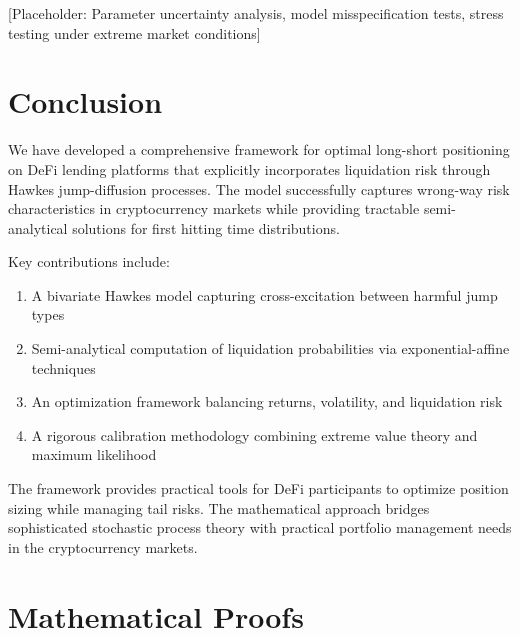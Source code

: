 \documentclass{article}
\theoremstyle{definition}
\begin{document}
[Placeholder: Parameter uncertainty analysis, model misspecification tests, stress testing under extreme market conditions]

\section{Conclusion}

We have developed a comprehensive framework for optimal long-short positioning on DeFi lending platforms that explicitly incorporates liquidation risk through Hawkes jump-diffusion processes. The model successfully captures wrong-way risk characteristics in cryptocurrency markets while providing tractable semi-analytical solutions for first hitting time distributions.

Key contributions include:
\begin{enumerate}
    \item A bivariate Hawkes model capturing cross-excitation between harmful jump types
    \item Semi-analytical computation of liquidation probabilities via exponential-affine techniques
    \item An optimization framework balancing returns, volatility, and liquidation risk
    \item A rigorous calibration methodology combining extreme value theory and maximum likelihood
\end{enumerate}

The framework provides practical tools for DeFi participants to optimize position sizing while managing tail risks. The mathematical approach bridges sophisticated stochastic process theory with practical portfolio management needs in the cryptocurrency markets.


\appendix

\section{Mathematical Proofs}
\label{sec:proofs}
\end{document}
